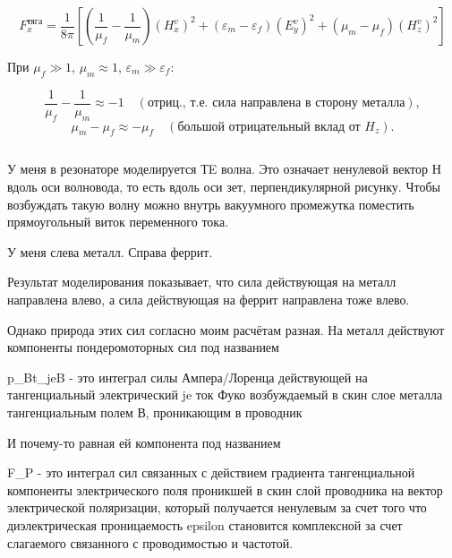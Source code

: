 \documentclass[11pt]{article}
\makeatletter
\newcommand{\boxspacing}{\kern\kvtcb@left@rule\kern\kvtcb@boxsep}
\newcommand{\prompt}[4]{
        {\ttfamily\llap{{\color{#2}[#3]:\hspace{3pt}#4}}\vspace{-\baselineskip}}
    }
\makeatother
\begin{document}
\begin{equation*}
\boxed{
    F_x^{\text{тяга}} = \frac{1}{8\pi}\left[
        \left(\frac{1}{\mu_f} - \frac{1}{\mu_m}\right)(H_x^v)^2
        + (\varepsilon_m - \varepsilon_f)(E_y^v)^2
        + (\mu_m - \mu_f)(H_z^v)^2
    \right]
}
\end{equation*}

При \(\mu_f \gg 1\), \(\mu_m \approx 1\),
\(\varepsilon_m \gg \varepsilon_f\):

\begin{equation*}
    \frac{1}{\mu_f} - \frac{1}{\mu_m} \approx -1 \quad (\text{отриц., т.е. }
    \text{сила направлена в сторону металла}),
\end{equation*}\begin{equation*}
    \mu_m - \mu_f \approx -\mu_f \quad (\text{большой отрицательный вклад от }H_z).
\end{equation*}

    \begin{tcolorbox}[breakable, size=fbox, boxrule=1pt, pad at break*=1mm,colback=cellbackground, colframe=cellborder]
\prompt{In}{incolor}{ }{\boxspacing}
\begin{Verbatim}[commandchars=\\\{\}]

\end{Verbatim}
\end{tcolorbox}

    У меня в резонаторе моделируется ТE волна. Это означает ненулевой вектор
Н вдоль оси волновода, то есть вдоль оси зет, перпендикулярной рисунку.
Чтобы возбуждать такую волну можно внутрь вакуумного промежутка
поместить прямоугольный виток переменного тока.

У меня слева металл. Справа феррит.

Результат моделирования показывает, что сила действующая на металл
направлена влево, а сила действующая на феррит направлена тоже влево.

Однако природа этих сил согласно моим расчётам разная. На металл
действуют компоненты пондеромоторных сил под названием

p\_Bt\_jeB - это интеграл силы Ампера/Лоренца действующей на
тангенциальный электрический je ток Фуко возбуждаемый в скин слое
металла тангенциальным полем В, проникающим в проводник

И почему-то равная ей компонента под названием

F\_P - это интеграл сил связанных с действием градиента тангенциальной
компоненты электрического поля проникшей в скин слой проводника на
вектор электрической поляризации, который получается ненулевым за счет
того что диэлектрическая проницаемость epsilon становится комплексной за
счет слагаемого связанного с проводимостью и частотой.
\end{document}

